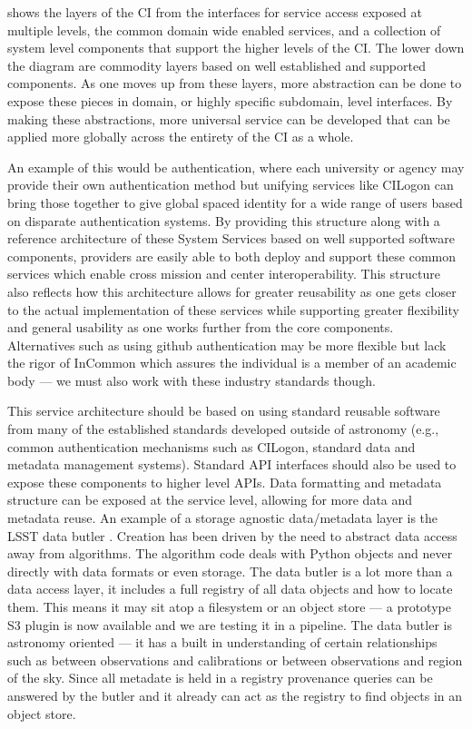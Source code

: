  shows the
layers of the \gls{CI} from the interfaces for service access exposed
at multiple levels, the common domain wide enabled services, and a collection of system level components that support the
higher levels of the \gls{CI}.
The lower down the diagram are commodity layers based on well established and supported
components. As one moves up from these layers, more abstraction can be done to
expose these pieces in domain, or highly specific subdomain, level interfaces. By making these
abstractions, more universal service can be developed that can be applied more globally
across the entirety of the \gls{CI} as a whole.

An example of this would be
authentication, where each university or agency may provide their own authentication method
but unifying services like CILogon can bring those together to give global spaced
identity for a wide range of users based on disparate authentication systems.
By providing this structure along with a reference architecture of these System Services based on
well supported software components, providers are easily able to both deploy and support these common services which enable
cross mission and center interoperability. This structure also reflects how this architecture allows for greater reusability as one gets closer to the actual implementation of these
services while supporting greater flexibility and general usability as one works further from the core components.
Alternatives such as using github authentication may be more flexible but lack the
 rigor of InCommon which assures the individual is a member of an academic body --- we must also work with these industry standards though.

This service architecture should be based on using standard reusable software from many of the established standards developed outside of astronomy (e.g., common authentication mechanisms such as CILogon, standard data and \gls{metadata} management systems).  Standard \gls{API} interfaces should also be used to expose these components to higher level \gls{API}s. Data
formatting and \gls{metadata} structure can be exposed at the service level, allowing for
more data and \gls{metadata} reuse.
 An example of a storage agnostic data/metadata layer is the \gls{LSST} data butler \citep{2018arXiv181208085J}. Creation  has been driven by the need to abstract data access away from algorithms.
The \gls{algorithm} code deals with Python objects and never directly with data formats or even storage. The data butler is a lot more than a data access layer, it includes a full registry of all data objects and how to locate them. This means it may sit atop a filesystem or an object store --- a prototype S3 plugin is now available and we are testing it in a \gls{pipeline}.  The data butler is astronomy oriented --- it has a built in understanding of certain relationships such as between observations and calibrations or between observations and region of the sky. Since all metadate is held in a registry \gls{provenance} queries can be answered by the butler and it already can act as the registry to find objects in an object store.



